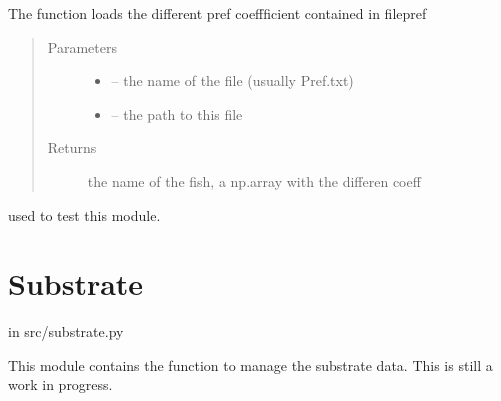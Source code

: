 \documentclass[letterpaper,10pt,english]{sphinxmanual}
\begin{document}
\begin{fulllineitems}
\label{\detokenize{index:src.stathab_c.load_pref}}
The function loads the different pref coeffficient contained in filepref
\begin{quote}\begin{description}
\item[{Parameters}] \leavevmode\begin{itemize}
\item {} 
 -- the name of the file (usually Pref.txt)

\item {} 
 -- the path to this file

\end{itemize}

\item[{Returns}] \leavevmode
the name of the fish, a np.array with the differen coeff

\end{description}\end{quote}

\end{fulllineitems}


\begin{fulllineitems}
\label{\detokenize{index:src.stathab_c.main}}
used to test this module.

\end{fulllineitems}



\section{Substrate}
\label{\detokenize{index:substrate}}
in src/substrate.py

This module contains the function to manage the substrate data. This is still a work in progress.
\label{\detokenize{index:module-src.substrate}}
\end{document}
